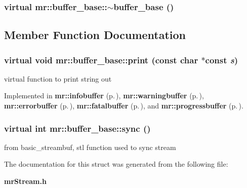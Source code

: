 \subsubsection{\setlength{\rightskip}{0pt plus 5cm}virtual mr::buffer\_\-base::$\sim${\bf buffer\_\-base} ()\hspace{0.3cm}{\tt  [inline, virtual]}}\label{structmr_1_1buffer__base_a1}




\subsection{Member Function Documentation}
\subsubsection{\setlength{\rightskip}{0pt plus 5cm}virtual void mr::buffer\_\-base::print (const char $\ast$const {\em s})\hspace{0.3cm}{\tt  [pure virtual]}}\label{structmr_1_1buffer__base_a3}


virtual function to print string out 



Implemented in {\bf mr::infobuffer} {\rm (p.\,\pageref{structmr_1_1infobuffer_a1})}, {\bf mr::warningbuffer} {\rm (p.\,\pageref{structmr_1_1warningbuffer_a1})}, {\bf mr::errorbuffer} {\rm (p.\,\pageref{structmr_1_1errorbuffer_a1})}, {\bf mr::fatalbuffer} {\rm (p.\,\pageref{structmr_1_1fatalbuffer_a1})}, and {\bf mr::progressbuffer} {\rm (p.\,\pageref{structmr_1_1progressbuffer_a1})}.
\subsubsection{\setlength{\rightskip}{0pt plus 5cm}virtual int mr::buffer\_\-base::sync ()\hspace{0.3cm}{\tt  [virtual]}}\label{structmr_1_1buffer__base_a2}


from basic\_\-streambuf, stl function used to sync stream 



The documentation for this struct was generated from the following file:\begin{CompactItemize}
\item 
{\bf mr\-Stream.h}\end{CompactItemize}
